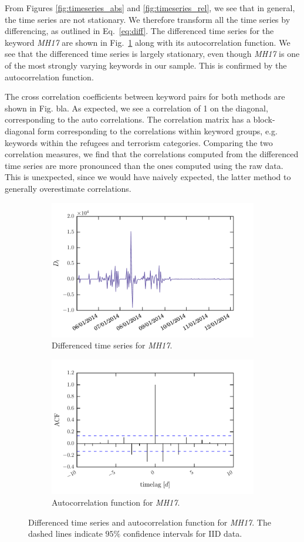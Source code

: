 \documentclass[12pt, a4paper]{article}
\begin{document}
From Figures \ref{fig:timeseries_abs} and \ref{fig:timeseries_rel}, we see that in general, the time series are not stationary. We therefore transform all the time series by differencing, as outlined in Eq.~\ref{eq:diff}. The differenced time series for the keyword \textit{MH17} are shown in Fig.~\ref{fig:diff_acf} along with its autocorrelation function. We see that the differenced time series is largely stationary, even though \textit{MH17} is one of the most strongly varying keywords in our sample. This is confirmed by the autocorrelation function.

The cross correlation coefficients between keyword pairs for both methods are shown in Fig. bla. As expected, we see a correlation of 1 on the diagonal, corresponding to the auto correlations. The correlation matrix has a block-diagonal form corresponding to the correlations within keyword groups, e.g. keywords within the refugees and terrorism categories. Comparing the two correlation measures, we find that the correlations computed from the differenced time series are more pronounced than the ones computed using the raw data. This is unexpected, since we would have naively expected, the latter method to generally overestimate correlations. 

\begin{figure}
\centering
\begin{subfigure}{.5\textwidth}
  \centering
  \includegraphics[width=.7\linewidth]{figs/mh17_diff.pdf}
  \caption{Differenced time series for \textit{MH17}.}
\end{subfigure}%
\begin{subfigure}{.5\textwidth}
  \centering
  \includegraphics[width=.7\linewidth]{figs/mh17_acf.pdf}
  \caption{Autocorrelation function for \textit{MH17}.}
\end{subfigure}
\caption{Differenced time series and autocorrelation function for \textit{MH17}. The dashed lines indicate $95 \%$ confidence intervals for IID data.}
\label{fig:diff_acf}
\end{figure}
\end{document}
